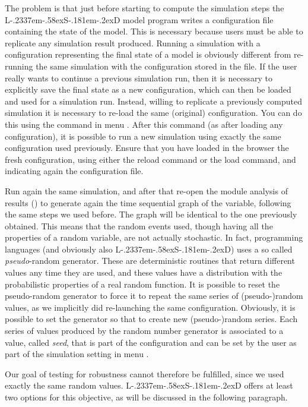 \documentclass [11pt,a4paper] {book}
\def\LsD{{L\kern-.2337em\lower-.58ex\hbox{S}\kern-.181em\lower-.2ex\hbox{D}}\xspace}
\begin{document}
The problem is that just before starting to compute the simulation steps the \LsD model program writes a configuration file containing the state of the model. This is necessary because users must be able to replicate any simulation result produced. Running a simulation with a configuration representing the final state of a model is obviously different from re-running the same simulation with the configuration stored in the file. If the user really wants to continue a previous simulation run, then it is necessary to explicitly save the final state as a new configuration, which can then be loaded and used for a simulation run. Instead, willing to replicate a previously computed simulation it is necessary to re-load the same (original) configuration. You can do this using the command in menu . After this command (as after loading any configuration), it is possible to run a new simulation using exactly the same configuration used previously. Ensure that you have loaded in the browser the fresh configuration, using either the reload command or the load command, and indicating again the  configuration file.

Run again the same simulation, and after that re-open the module analysis of results () to generate again the time sequential graph of the  variable, following the same steps we used before. The graph will be identical to the one previously obtained. This means that the random events used, though having all the properties of a random variable, are not actually stochastic. In fact, programming languages (and obviously also \LsD) uses a so called \textit{pseudo}-random generator. These are deterministic routines that return different values any time they are used, and these values have a distribution with the probabilistic properties of a real random function. It is possible to reset the pseudo-random generator to force it to repeat the same series of (pseudo-)random values, as we implicitly did re-launching the same configuration. Obviously, it is possible to set the generator so that to create new (pseudo-)random series. Each series of values produced by the random number generator is associated to a value, called \textit{seed}, that is part of the configuration and can be set by the user as part of the simulation setting in menu .

Our goal of testing for robustness cannot therefore be fulfilled, since we used exactly the same random values. \LsD offers at least two options for this objective, as will be discussed in the following paragraph.
\end{document}
